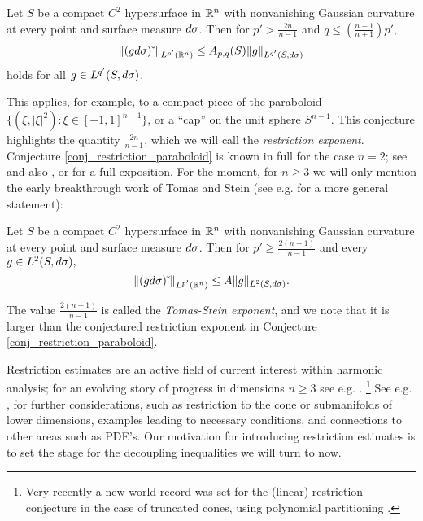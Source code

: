 \documentclass[brochure,english,12pt]{bourbaki}%
\begin{document}
\begin{conj}\label{conj_restriction_paraboloid}
Let $S$ be a compact $C^2$ hypersurface in $\mathbb{R}^n$ with nonvanishing Gaussian curvature at every point and surface measure $d \sigma$. Then for $p' > \frac{2n}{n-1}$ and $q \leq  (\frac{n-1}{n+1})p'$,
\[ \| (g d\sigma)\check{\;} \|_{L^{p'}(\mathbb{R}^n)} \leq A_{p,q}(S) \|g\|_{L^{q'}(S,d\sigma)} \]
holds for all $g \in L^{q'}(S,d\sigma)$.
\end{conj}
This applies, for example, to a compact piece of the paraboloid $\{ (\xi,|\xi|^2):  \xi \in  [-1,1]^{n-1}\}$, or a ``cap'' on the unit sphere $S^{n-1}$.
This conjecture highlights the quantity $\frac{2n}{n-1}$, which we will call the \emph{restriction exponent}.
Conjecture \ref{conj_restriction_paraboloid} is known in full for the case $n=2$; see \cite{Fef70} and also \cite{Zyg71}, or \cite[Ch. IX \S 5.1 and p. 432]{SteinHA} for a full exposition.
For the moment, for $n \geq 3$ we will only mention the early breakthrough work of  Tomas \cite{Tom75} and Stein (see e.g. \cite[Ch. IX \S 2.1]{SteinHA} for a more general statement):
 \begin{theo}\label{thm_SteinTomas}
  Let $S$ be a compact $C^2$ hypersurface in $\mathbb{R}^n$ with nonvanishing Gaussian curvature at every point and  surface measure $d\sigma$. Then for $p' \geq \frac{2(n+1)}{n-1}$ and every  $g \in L^2(S,d\sigma),$
  \[ \| (gd\sigma)\check{\;} \|_{L^{p'}(\mathbb{R}^n)} \leq A \|g\|_{L^{2}(S,d\sigma)}.\]
 \end{theo}
  The value $\frac{2(n+1)}{n-1}$ is called the \emph{Tomas-Stein exponent}, and we note that it is larger than the conjectured restriction exponent in Conjecture \ref{conj_restriction_paraboloid}. 
  
  Restriction estimates are an active field of current interest within harmonic analysis; for an evolving story of progress in dimensions $n \geq 3$ see e.g. \cite[Figure 1]{Tao04}. \footnote{Very recently a new world record was set for the (linear) restriction conjecture in the case of truncated cones, using polynomial partitioning \cite{OuWan17x}.}
See e.g. \cite{Tao04}, \cite{SteinHA} for  further considerations, such as restriction to the cone or submanifolds of lower dimensions, examples leading to necessary conditions, and connections to other areas such as PDE's.
Our motivation for introducing restriction estimates is to set the stage for the decoupling inequalities we will turn to now.
\end{document}

